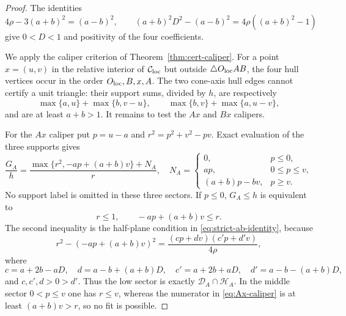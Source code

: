 \begin{proof}
The identities
\[
 4\rho-3(a+b)^2=(a-b)^2,
 \qquad
 (a+b)^2D^2-(a-b)^2=4\rho((a+b)^2-1)
\]
give $0<D<1$ and positivity of the four coefficients.

We apply the caliper criterion of Theorem~\ref{thm:cert-caliper}.  For a
point $x=(u,v)$ in the relative interior of $\mathcal C_{\rm loc}$ but outside
$\triangle O_{\rm loc}AB$, the four hull vertices occur in the order $O_{\rm loc},B,x,A$.
The two cone-axis hull edges cannot certify a unit triangle: their support
sums, divided by $h$, are respectively
\[
 \max\{a,u\}+\max\{b,v-u\},\qquad
 \max\{b,v\}+\max\{a,u-v\},
\]
and are at least $a+b>1$.  It remains to test the $Ax$ and $Bx$ calipers.

For the $Ax$ caliper put $p=u-a$ and
$r^2=p^2+v^2-pv$.  Exact evaluation of the three supports gives
\begin{equation}
 \frac{G_A}{h}=
 \frac{\max\{r^2,-ap+(a+b)v\}+N_A}{r},
 \quad
 N_A=\begin{cases}
 0,&p\le0,\\
 ap,&0\le p\le v,\\
 (a+b)p-bv,&p\ge v.
 \end{cases}                                      \label{eq:Ax-caliper}
\end{equation}
No support label is omitted in these three sectors.  If $p\le0$,
$G_A\le h$ is equivalent to
\[
 r\le1,\qquad -ap+(a+b)v\le r.
\]
The second inequality is the half-plane condition in
\eqref{eq:strict-ab-identity}, because
\[
 r^2-(-ap+(a+b)v)^2
 =\frac{(cp+dv)(c'p+d'v)}{4\rho},
\]
where
\[
 c=a+2b-aD,\quad d=a-b+(a+b)D,
 \quad c'=a+2b+aD,\quad d'=a-b-(a+b)D,
\]
and $c,c',d>0>d'$.  Thus the low sector is exactly
$\mathcal D_A\cap\mathcal H_A$.  In the middle sector $0<p\le v$ one has
$r\le v$, whereas the numerator in \eqref{eq:Ax-caliper} is at least
$(a+b)v>r$, so no fit is possible.


\end{proof}
